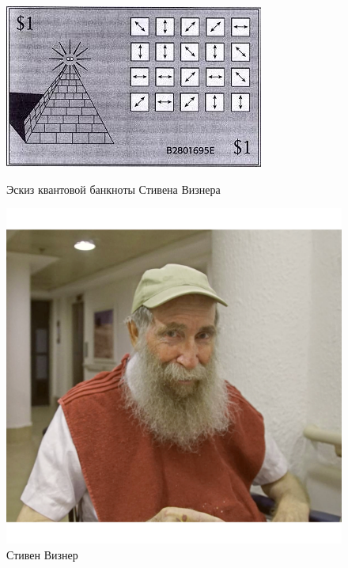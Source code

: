 \begin{figure}[h!]
    \begin{center}
    \begin{minipage}[h]{0.4\linewidth}
        \includegraphics[width=1\linewidth]{pics/quantum_money.jpg}
        \caption{Эскиз квантовой банкноты Стивена Визнера} 
    \label{} 
    \end{minipage}
\hfill
    \begin{minipage}[h]{0.5\linewidth}
        \includegraphics[width=1\linewidth]{pics/Stephen_Wiesner.jpg}
        \caption{Стивен Визнер}
        \label{}
    \end{minipage}
    \end{center}
\end{figure}

